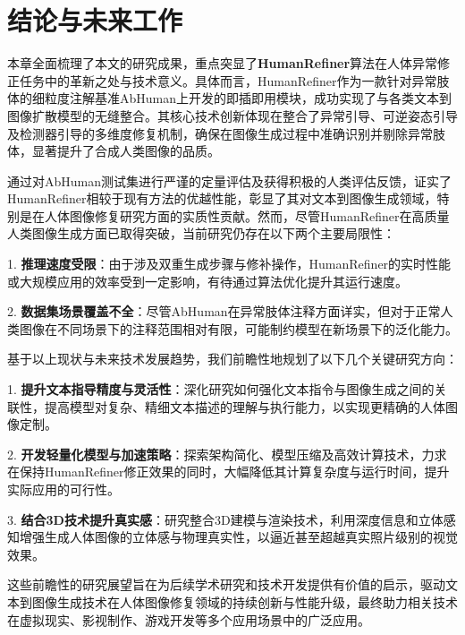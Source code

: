 \chapter{结论与未来工作}
本章全面梳理了本文的研究成果，重点突显了\textbf{HumanRefiner}算法在人体异常修正任务中的革新之处与技术意义。具体而言，HumanRefiner作为一款针对异常肢体的细粒度注解基准AbHuman上开发的即插即用模块，成功实现了与各类文本到图像扩散模型的无缝整合。其核心技术创新体现在整合了异常引导、可逆姿态引导及检测器引导的多维度修复机制，确保在图像生成过程中准确识别并剔除异常肢体，显著提升了合成人类图像的品质。

通过对AbHuman测试集进行严谨的定量评估及获得积极的人类评估反馈，证实了HumanRefiner相较于现有方法的优越性能，彰显了其对文本到图像生成领域，特别是在人体图像修复研究方面的实质性贡献。然而，尽管HumanRefiner在高质量人类图像生成方面已取得突破，当前研究仍存在以下两个主要局限性：

1. \textbf{推理速度受限}：由于涉及双重生成步骤与修补操作，HumanRefiner的实时性能或大规模应用的效率受到一定影响，有待通过算法优化提升其运行速度。

2. \textbf{数据集场景覆盖不全}：尽管AbHuman在异常肢体注释方面详实，但对于正常人类图像在不同场景下的注释范围相对有限，可能制约模型在新场景下的泛化能力。

基于以上现状与未来技术发展趋势，我们前瞻性地规划了以下几个关键研究方向：

1. \textbf{提升文本指导精度与灵活性}：深化研究如何强化文本指令与图像生成之间的关联性，提高模型对复杂、精细文本描述的理解与执行能力，以实现更精确的人体图像定制。

2. \textbf{开发轻量化模型与加速策略}：探索架构简化、模型压缩及高效计算技术，力求在保持HumanRefiner修正效果的同时，大幅降低其计算复杂度与运行时间，提升实际应用的可行性。

3. \textbf{结合3D技术提升真实感}：研究整合3D建模与渲染技术，利用深度信息和立体感知增强生成人体图像的立体感与物理真实性，以逼近甚至超越真实照片级别的视觉效果。

这些前瞻性的研究展望旨在为后续学术研究和技术开发提供有价值的启示，驱动文本到图像生成技术在人体图像修复领域的持续创新与性能升级，最终助力相关技术在虚拟现实、影视制作、游戏开发等多个应用场景中的广泛应用。